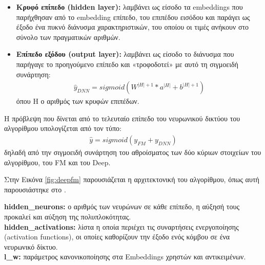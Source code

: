 \begin{enumerate}
\begin{itemize}
		\item \textbf{Κρυφό επίπεδο (hidden layer):} λαμβάνει ως είσοδο τα embeddings που παρήχθησαν από το embedding επίπεδο, του επιπέδου εισόδου και παράγει ως έξοδο ένα πυκνό διάνυσμα χαρακτηριστικών, του οποίου οι τιμές ανήκουν στο σύνολο των πραγματικών αριθμών.
		\item \textbf{Επίπεδο εξόδου (output layer):} λαμβάνει ως είσοδο το διάνυσμα που παρήγαγε το προηγούμενο επίπεδο και «τροφοδοτεί» με αυτό τη σιγμοειδή συνάρτηση:
		 \begin{align}		
			\hat{y}_{DNN} = sigmoid\left({W^{|H|+1}}\ast{a^{|H|}} + b^{|H|+1}\right)
		\end{align}
	όπου Η ο αριθμός των κρυφών επιπέδων.
	\end{itemize} 
    Η πρόβλεψη που δίνεται από το τελευταίο επίπεδο του νευρωνικού δικτύου του αλγορίθμου υπολογίζεται από τον τύπο:
	 \begin{align}		
	  \hat{y} = sigmoid\left( y_{FM} + y_{DNN}\right) 
    \end{align}
δηλαδή από την σιγμοειδή συνάρτηση του αθροίσματος των δύο κύριων στοιχείων του αλγορίθμου, του FM και του Deep.
\end{enumerate}
Στην Εικόνα \ref{fig:deepfm} παρουσιάζεται η αρχιτεκτονική του αλγορίθμου, όπως αυτή παρουσιάστηκε στο \cite{guoDeepFMFactorizationMachineBased2017} .
\begin{tcolorbox}[
	colframe=blue!25,
	colback=blue!10,
	coltitle=blue!20!black,  
	fonttitle=\bfseries,
	adjusted title= Υπερπαράμετροι]
	\textbf{hidden\_neurons:} ο αριθμός των νευρώνων σε κάθε επίπεδο, η αύξησή τους προκαλεί και αύξηση της πολυπλοκότητας.\\
	\textbf{hidden\_activations:} λίστα η οποία περιέχει τις συναρτήσεις ενεργοποίησης (activation functions), οι οποίες καθορίζουν την έξοδο ενός κόμβου σε ένα νευρωνικό δίκτυο.\\
	\textbf{l\_w:} παράμετρος κανονικοποίησης στα Embeddings χρηστών και αντικειμένων.

\end{tcolorbox}
